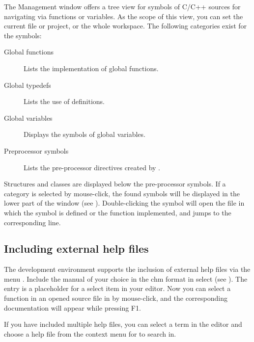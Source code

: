 The \codeblocks Management window offers a tree view for symbols of C/C++ sources for navigating via functions or variables. As the scope of this view, you can set the current file or project, or the whole workspace. The following categories exist for the symbols:


\begin{description}
\item[Global functions] Lists the implementation of global functions.
\item[Global typedefs] Lists the use of  definitions.
\item[Global variables] Displays the symbols of global variables.
\item[Preprocessor symbols] Lists the pre-processor directives created by .
\end{description}

Structures and classes are displayed below the pre-processor symbols. If a category is selected by mouse-click, the found symbols will be displayed in the lower part of the window (see ). Double-clicking the symbol will open the file in which the symbol is defined or the function implemented, and jumps to the corresponding line.


\subsection{Including external help files}

The \codeblocks development environment supports the inclusion of external help files via the menu . Include the manual of your choice in the chm format in  select  (see ). The entry  is a placeholder for a select item in your editor. Now you can select a function in an opened source file in \codeblocks by mouse-click, and the corresponding documentation will appear while pressing F1.

If you have included multiple help files, you can select a term in the editor and choose a help file from the context menu  for \codeblocks to search in.

